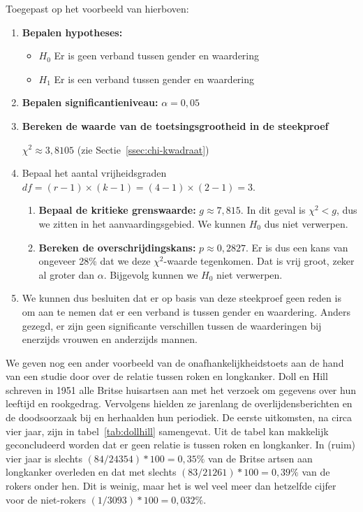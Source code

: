 Toegepast op het voorbeeld van hierboven:

\begin{enumerate}
  \item \textbf{Bepalen hypotheses:}
  \begin{itemize}
    \item $H_0$ Er is geen verband tussen gender en waardering
    \item $H_1$ Er is een verband tussen gender en waardering
  \end{itemize}
  \item \textbf{Bepalen significantieniveau:} $\alpha = 0,05$
  
  \item \textbf{Bereken de waarde van de toetsingsgrootheid in de steekproef}
  
  $\chi^2 \approx 3,8105$ (zie Sectie~\ref{ssec:chi-kwadraat})
  
  \item Bepaal het aantal vrijheidsgraden $df = (r - 1) \times (k - 1) = (4 - 1) \times (2 - 1) = 3$.
  
  \begin{enumerate}
    \item \textbf{Bepaal de kritieke grenswaarde:} $g \approx 7,815$. In dit geval is $\chi^2 < g$, dus we zitten in het aanvaardingsgebied. We kunnen $H_0$ dus niet verwerpen.
    \item \textbf{Bereken de overschrijdingskans:} $p \approx 0,2827$. Er is dus een kans van ongeveer 28\% dat we deze $\chi^2$-waarde tegenkomen. Dat is vrij groot, zeker al groter dan $\alpha$. Bijgevolg kunnen we $H_0$ niet verwerpen.
  \end{enumerate}

  \item We kunnen dus besluiten dat er op basis van deze steekproef geen reden is om aan te nemen dat er een verband is tussen gender en waardering. Anders gezegd, er zijn geen significante verschillen tussen de waarderingen bij enerzijds vrouwen en anderzijds mannen.
\end{enumerate}


We geven nog een ander voorbeeld van de onafhankelijkheidstoets aan de hand van een studie door \textcite{Doll1954} over de relatie tussen roken en longkanker. Doll en Hill schreven in 1951 alle Britse huisartsen aan met het verzoek om gegevens over hun leeftijd en rookgedrag. Vervolgens hielden ze jarenlang de overlijdensberichten en de doodsoorzaak bij en herhaalden hun periodiek. De eerste uitkomsten, na circa vier jaar, zijn in tabel~\ref{tab:dollhill} samengevat. Uit de tabel kan makkelijk geconcludeerd worden dat er geen relatie is tussen roken en longkanker. In (ruim) vier jaar is slechts $(84 / 24354) * 100 = 0,35\%$ van de Britse artsen aan longkanker overleden en dat met slechts $(83 / 21261) * 100 = 0,39\%$ van de rokers onder hen. Dit is weinig, maar het is wel veel meer dan hetzelfde cijfer voor de niet-rokers $(1 / 3093) * 100 = 0,032\%$.

